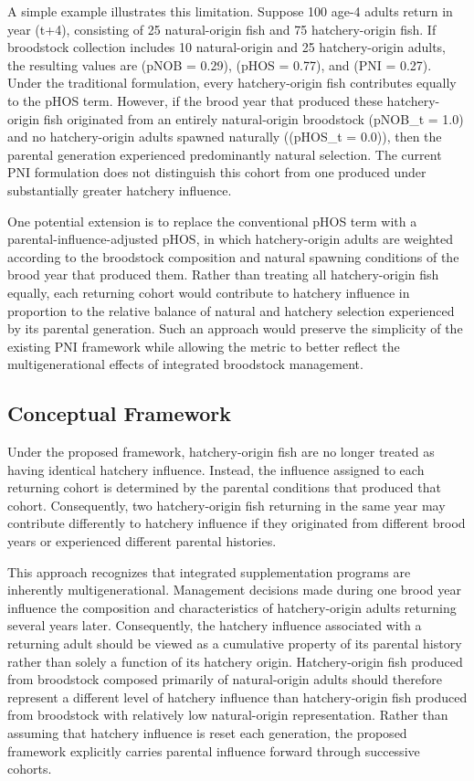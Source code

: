 \documentclass[12pt,letterpaper]{article}
\begin{document}
A simple example illustrates this limitation. Suppose 100 age-4 adults return in year (t+4), consisting of 25 natural-origin fish and 75 hatchery-origin fish. If broodstock collection includes 10 natural-origin and 25 hatchery-origin adults, the resulting values are (pNOB = 0.29), (pHOS = 0.77), and (PNI = 0.27). Under the traditional formulation, every hatchery-origin fish contributes equally to the pHOS term. However, if the brood year that produced these hatchery-origin fish originated from an entirely natural-origin broodstock (pNOB\_t = 1.0) and no hatchery-origin adults spawned naturally ((pHOS\_t = 0.0)), then the parental generation experienced predominantly natural selection. The current PNI formulation does not distinguish this cohort from one produced under substantially greater hatchery influence.

One potential extension is to replace the conventional pHOS term with a parental-influence-adjusted pHOS, in which hatchery-origin adults are weighted according to the broodstock composition and natural spawning conditions of the brood year that produced them. Rather than treating all hatchery-origin fish equally, each returning cohort would contribute to hatchery influence in proportion to the relative balance of natural and hatchery selection experienced by its parental generation. Such an approach would preserve the simplicity of the existing PNI framework while allowing the metric to better reflect the multigenerational effects of integrated broodstock management.

\subsection{Conceptual Framework}\label{conceptual-framework}

Under the proposed framework, hatchery-origin fish are no longer treated as having identical hatchery influence. Instead, the influence assigned to each returning cohort is determined by the parental conditions that produced that cohort. Consequently, two hatchery-origin fish returning in the same year may contribute differently to hatchery influence if they originated from different brood years or experienced different parental histories.

This approach recognizes that integrated supplementation programs are inherently multigenerational. Management decisions made during one brood year influence the composition and characteristics of hatchery-origin adults returning several years later. Consequently, the hatchery influence associated with a returning adult should be viewed as a cumulative property of its parental history rather than solely a function of its hatchery origin. Hatchery-origin fish produced from broodstock composed primarily of natural-origin adults should therefore represent a different level of hatchery influence than hatchery-origin fish produced from broodstock with relatively low natural-origin representation. Rather than assuming that hatchery influence is reset each generation, the proposed framework explicitly carries parental influence forward through successive cohorts.
\end{document}
